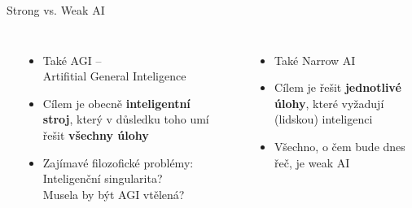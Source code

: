 \documentclass[handout,aspectratio=169,dvipsnames]{beamer}
\begin{document}

\begin{frame}{Strong vs. Weak AI}

    \begin{columns}[t]
        \begin{center}
        \end{center}

        \vspace{5pt}

        \begin{itemize}

            \item<2-> Také AGI -- \\ \quad Artifitial General Inteligence

            \item<3-> Cílem je obecně \textbf{inteligentní stroj}, který v důsledku
			    toho umí řešit \textbf{všechny úlohy}

            \item<4-> Zajímavé filozofické problémy: \\ Inteligenční singularita?
                \\ Musela by být AGI vtělená?

        \end{itemize}


        \begin{center}
        \end{center}

        \vspace{5pt}

        \begin{itemize}

            \item<6-> Také Narrow AI

            \item<7-> Cílem je řešit \textbf{jednotlivé úlohy}, které vyžadují
					(lidskou) inteligenci

            \item<8-> Všechno, o čem bude dnes řeč, je weak AI

        \end{itemize}

		\vspace{15pt}


    \end{columns}


\end{frame}
\end{document}
